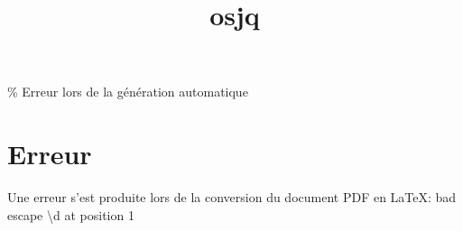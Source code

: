 \documentclass[12pt]{article}
\title{osjq}
\author{}
\date{}
\begin{document}
\maketitle
\tableofcontents
\newpage

\% Erreur lors de la génération automatique
\section{Erreur}
Une erreur s'est produite lors de la conversion du document PDF en LaTeX: bad escape \textbackslash{}d at position 1
\end{document}

